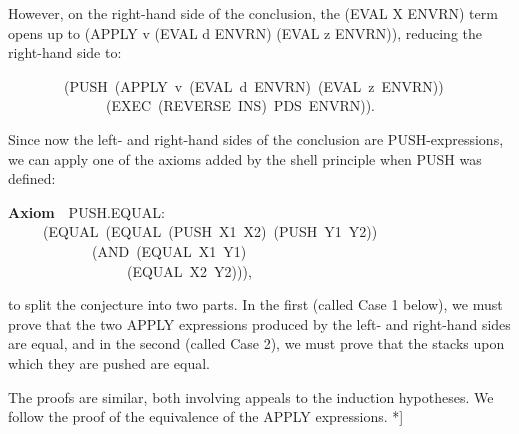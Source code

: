 \documentclass[10pt]{book}
\newenvironment{pubasis}{\begin{flushleft}}{\end{flushleft}}
\newcommand{\axiomordefinition}[1]{\vspace{6pt}\Large\textsf{\textbf{#1}}\normalsize}
\begin{document}
However, on the right-hand side of the conclusion, the
(EVAL X ENVRN) term opens up to (APPLY v (EVAL d ENVRN) (EVAL z ENVRN)), reducing the right-hand side
to:
\begin{pubasis}
~~~~~~~~(PUSH~(APPLY~v~(EVAL~d~ENVRN)~(EVAL~z~ENVRN))\\
~~~~~~~~~~~~~~(EXEC~(REVERSE~INS)~PDS~ENVRN)).\\
\end{pubasis}
Since now the left- and right-hand sides of the conclusion are
PUSH-expressions,
we can apply one of the axioms added by the shell principle
when PUSH was defined:
\begin{pubasis}
\axiomordefinition{Axiom}~~PUSH.EQUAL:\\
~~~~~(EQUAL~(EQUAL~(PUSH~X1~X2)~(PUSH~Y1~Y2))\\
~~~~~~~~~~~~(AND~(EQUAL~X1~Y1)\\
~~~~~~~~~~~~~~~~~(EQUAL~X2~Y2))),\\
\end{pubasis}
to split the conjecture into two parts.  In the first (called Case 1 below),
we must prove that the two APPLY expressions produced by the left- and
right-hand sides are equal, and in the second (called Case 2), we must prove that
the stacks upon which they are pushed are equal.

The proofs are similar, both involving appeals to the induction hypotheses.
We  follow the proof of the equivalence of the APPLY expressions. *]
\end{document}
